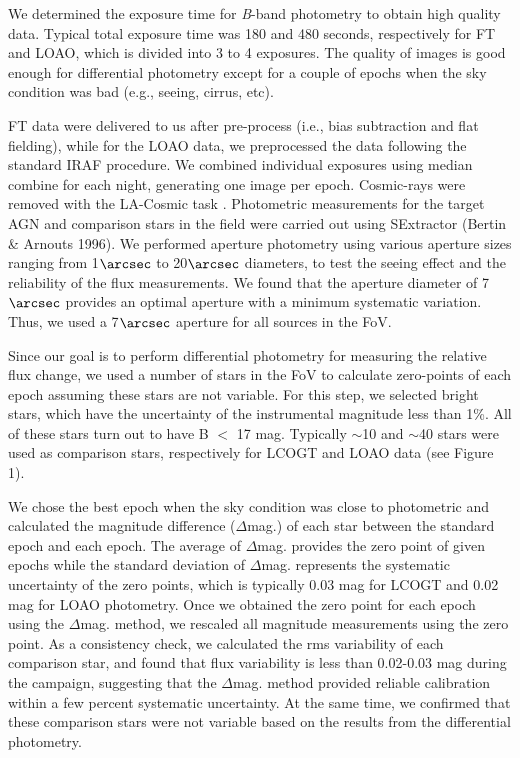 \documentclass[iop]{emulateapj}
\begin{document}
We determined the exposure time for \textit{B}-band photometry to obtain high quality data. 
Typical total exposure time was 180 and 480 seconds, respectively for FT and LOAO, which is divided into 3 to 4 exposures. 
The quality of images is good enough for differential photometry except for a couple of epochs when the sky condition was bad (e.g., seeing, cirrus, etc). 

FT data were delivered to us after pre-process (i.e., bias subtraction and flat fielding), while for the LOAO data, we preprocessed the data following the standard IRAF procedure.
We combined individual exposures using median combine for each night, generating one image per epoch. 
Cosmic-rays were removed with the LA-Cosmic task \citep{vanDokkum2001}. 
Photometric measurements for the target AGN and comparison stars in the field were carried out using SExtractor (Bertin \& Arnouts 1996).
We performed aperture photometry using various aperture sizes ranging from 1$\arcsec$ to 20$\arcsec$ diameters, 
to test the seeing effect and the reliability of the flux measurements. 
We found that the aperture diameter of 7$\arcsec$ provides an optimal aperture with a minimum systematic variation. 
Thus, we used a 7$\arcsec$ aperture for all sources in the FoV.

Since our goal is to perform differential photometry for measuring the relative flux change, we used a number of stars in the FoV to 
calculate zero-points of each epoch assuming these stars are not variable. For this step, we selected bright stars, which have the uncertainty of the instrumental magnitude less than 1\%. All of these stars turn out to have B $<$ 17 mag.
Typically $\sim$10 and $\sim$40 stars were used as comparison stars, respectively for LCOGT and LOAO data (see Figure 1).
 
We chose the best epoch when the sky condition was close to photometric and calculated the magnitude difference ($\Delta$mag.) of each star between the standard epoch and each epoch. The average of $\Delta$mag. provides the zero point of given epochs while the standard deviation of $\Delta$mag. represents the systematic uncertainty of the zero points, which is typically 0.03 mag for LCOGT and 0.02 mag for LOAO photometry.
Once we obtained the zero point for each epoch using the $\Delta$mag. method, we rescaled all magnitude measurements using the zero point. 
As a consistency check, we calculated the rms variability of each comparison star, and found that flux variability is less than 
0.02-0.03 mag during the campaign, suggesting that the $\Delta$mag. method provided reliable calibration within a few percent systematic uncertainty. At the same time, we confirmed that these comparison stars were not variable based on the results from the differential photometry.
\end{document}

